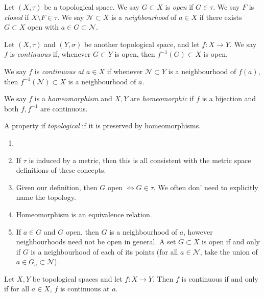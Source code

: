 \documentclass[12pt]{article}
\begin{document}
\begin{definition}
	Let $(X, \tau)$ be a topological space. We say $G \subset X$ is \textit{open} if $G \in \tau$. We say $F$ is \textit{closed} if $X \setminus F \in \tau$. We say $\mathcal{N} \subset X$ is a \textit{neighbourhood} of $a \in X$ if there exists $G \subset X$ open with $a \in G \subset \mathcal{N}$.
\end{definition}

\begin{definition}
	Let $(X, \tau)$ and $(Y, \sigma)$ be another topological space, and let $f : X \to Y$. We say $f$ is \textit{continuous} if, whenever $G \subset Y$ is open, then $f^{-1}(G) \subset X$ is open.

	We say $f$ is \textit{continuous at} $a \in X$ if whenever $\mathcal{N} \subset Y$ is a neighbourhood of $f(a)$, then $f^{-1}(\mathcal{N}) \subset X$ is a neighbourhood of $a$.

	We say $f$ is a \textit{homeomorphism} and $X, Y$ are \textit{homeomorphic} if $f$ is a bijection and both $f, f^{-1}$ are continuous.

	A property if \textit{topological} if it is preserved by homeomorphisms.
\end{definition}

\begin{remark}
	\begin{enumerate}[1.]
		\item[]
		\item If $\tau$ is induced by a metric, then this is all consistent with the metric space definitions of these concepts.
		\item Given our definition, then $G$ open $\iff G \in \tau$. We often don' need to explicitly name the topology.
		\item Homeomorphism is an equivalence relation.
		\item If $a \in G$ and $G$ open, then $G$ is a neighbourhood of $a$, however neighbourhoods need not be open in general. A set $G \subset X$ is open if and only if $G$ is a neighbourhood of each of its points (for all $a \in \mathcal{N}$, take the union of $a \in G_{a} \subset \mathcal{N}$).
	\end{enumerate}
\end{remark}

\begin{proposition}
	Let $X, Y$ be topological spaces and let $f : X \to Y$. Then $f$ is continuous if and only if for all $a \in X$, $f$ is continuous at $a$.
\end{proposition}
\end{document}
